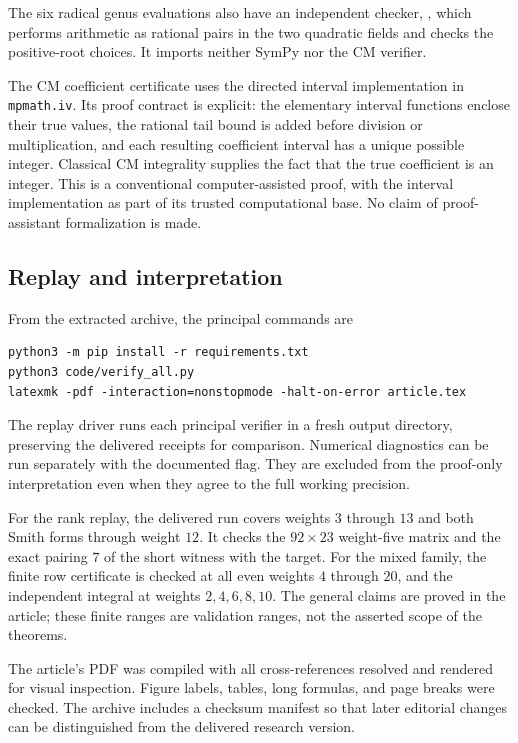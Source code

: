 The six radical genus evaluations also have an independent checker,
, which performs arithmetic as rational
pairs in the two quadratic fields and checks the positive-root choices.
It imports neither SymPy nor the CM verifier.

The CM coefficient certificate uses the directed interval implementation
in \texttt{mpmath.iv}. Its proof contract is explicit: the elementary
interval functions enclose their true values, the rational tail bound is
added before division or multiplication, and each resulting coefficient
interval has a unique possible integer. Classical CM integrality supplies
the fact that the true coefficient is an integer. This is a conventional
computer-assisted proof, with the interval implementation as part of its
trusted computational base. No claim of proof-assistant formalization is
made.

\subsection{Replay and interpretation}

From the extracted archive, the principal commands are
\begin{verbatim}
python3 -m pip install -r requirements.txt
python3 code/verify_all.py
latexmk -pdf -interaction=nonstopmode -halt-on-error article.tex
\end{verbatim}
The replay driver runs each principal verifier in a fresh output
directory, preserving the delivered receipts for comparison. Numerical
diagnostics can be run separately with the documented flag. They are
excluded from the proof-only interpretation even when they agree to the
full working precision.

For the rank replay, the delivered run covers weights $3$ through $13$
and both Smith forms through weight $12$. It checks the $92\times23$
weight-five matrix and the exact pairing $7$ of the short witness with
the target. For the mixed family, the finite row certificate is checked
at all even weights $4$ through $20$, and the independent integral at
weights $2,4,6,8,10$. The general claims are proved in the article;
these finite ranges are validation ranges, not the asserted scope of
the theorems.

The article's PDF was compiled with all cross-references resolved and
rendered for visual inspection. Figure labels, tables, long formulas,
and page breaks were checked. The archive includes a checksum manifest
so that later editorial changes can be distinguished from the delivered
research version.

